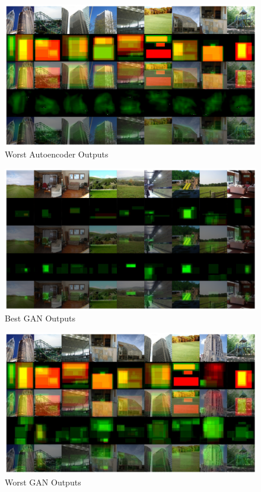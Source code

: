 \documentclass{UoYCSproject}
\begin{document}
\begin{figure}[ht]
    \centering
    \includegraphics[width=\linewidth]{Worst autoencoder Outputs}
    \caption{Worst Autoencoder Outputs}
    \label{fig:autoencoderWorstOutput}
\end{figure}

\begin{figure}[ht]
    \centering
    \includegraphics[width=\linewidth]{Best GAN Outputs}
    \caption{Best GAN Outputs}
    \label{fig:GANBestOutput}
\end{figure}

\begin{figure}[ht]
    \centering
    \includegraphics[width=\linewidth]{Worst GAN Outputs}
    \caption{Worst GAN Outputs}
    \label{fig:GANWorstOutput}
\end{figure}
\end{document}

